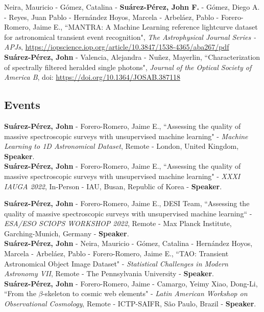 \documentclass[10pt, a4paper]{article}
\newcommand{\years}[1]{\marginnote{\scriptsize #1}}
\begin{document}
\years{2020}Neira, Mauricio - Gómez, Catalina - \textbf{Suárez-Pérez, John F.} - Gómez, Diego A. - Reyes, Juan Pablo - Hernández Hoyos, Marcela - Arbeláez, Pablo - Forero-Romero, Jaime E., “MANTRA: A Machine Learning reference lightcurve dataset for astronomical transient event recognition", \emph{The Astrophysical Journal Series - APJs}, \url{https://iopscience.iop.org/article/10.3847/1538-4365/aba267/pdf} 
\\

\years{2020}\textbf{Suárez-Pérez, John} - Valencia, Alejandra - Nuñez, Mayerlin, “Characterization of spectrally filtered heralded single photons", \emph{Journal of the Optical Society of America B}, doi: \url{https://doi.org/10.1364/JOSAB.387118}
\fi
\iffalse
\subsection*{Events}
\noindent
\years{2023}\textbf{Suárez-Pérez, John} - Forero-Romero, Jaime E., “Assessing the quality of 
massive spectroscopic surveys with unsupervised machine learning" - \emph{Machine Learning to 1D 
Astronomical Dataset}, Remote - London, 
United Kingdom, \textbf{Speaker}.\\

\years{2022}\textbf{Suárez-Pérez, John} - Forero-Romero, Jaime E., “Assessing the quality of massive spectroscopic surveys with unsupervised machine learning" - \emph{XXXI IAUGA 2022}, In-Person - IAU, Busan, Republic of Korea - \textbf{Speaker}.\\
\newpage

\years{2022}\textbf{Suárez-Pérez, John} - Forero-Romero, Jaime E., DESI Team,  “Assessing the quality of massive spectroscopic surveys with unsupervised machine learning“ - \emph{ESA/ESO SCIOPS WORKSHOP 2022}, Remote - Max Planck Institute, Garching-Munich, Germany - \textbf{Speaker}.\\

\years{2021}\textbf{Suárez-Pérez, John} - Neira, Mauricio - Gómez, Catalina - Hernández Hoyos, Marcela - Arbeláez, Pablo - Forero-Romero, Jaime E., “TAO: Transient Astronomical Object Image Dataset" - \emph{Statistical Challenges in Modern Astronomy VII}, Remote - The Pennsylvania University - \textbf{Speaker}.\\

\years{2020}\textbf{Suárez-Pérez, John} - Forero-Romero, Jaime - Camargo, Yeimy  Xiao, Dong-Li, “From the $\beta$-skeleton to cosmic web elements" - \emph{Latin American Workshop on Observational Cosmology}, Remote - ICTP-SAIFR, São Paulo, Brazil - \textbf{Speaker}.\\
\end{document}
